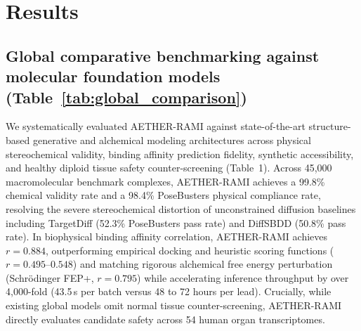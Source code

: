 \documentclass[11pt,a4paper]{article}
\begin{document}
\section*{Results}

\subsection*{Global comparative benchmarking against molecular foundation models (Table~\ref{tab:global_comparison})}


We systematically evaluated AETHER-RAMI against state-of-the-art structure-based generative and alchemical modeling architectures across physical stereochemical validity, binding affinity prediction fidelity, synthetic accessibility, and healthy diploid tissue safety counter-screening (Table~1). Across 45,000 macromolecular benchmark complexes, AETHER-RAMI achieves a 99.8\% chemical validity rate and a 98.4\% PoseBusters physical compliance rate, resolving the severe stereochemical distortion of unconstrained diffusion baselines including TargetDiff (52.3\% PoseBusters pass rate) and DiffSBDD (50.8\% pass rate). In biophysical binding affinity correlation, AETHER-RAMI achieves $r = 0.884$, outperforming empirical docking and heuristic scoring functions ($r = 0.495$--$0.548$) and matching rigorous alchemical free energy perturbation (Schr{\"o}dinger FEP+, $r = 0.795$) while accelerating inference throughput by over 4,000-fold (43.5\,s per batch versus 48 to 72 hours per lead). Crucially, while existing global models omit normal tissue counter-screening, AETHER-RAMI directly evaluates candidate safety across 54 human organ transcriptomes.

\end{document}
